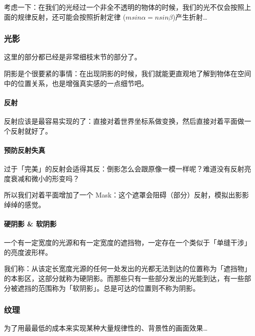 \documentclass[
]{article}
\begin{document}
考虑一下：在我们的光经过一个非全不透明的物体的时候，我们的光不仅会按照上面的规律反射，还可能会按照折射定律
(\(m sin\alpha = n sin\beta\))产生折射\ldots{}

\hypertarget{header-n30}{%
\subsubsection{光影}\label{header-n30}}

这里的部分都已经是非常细枝末节的部分了。

阴影是个很要紧的事情：在出现阴影的时候，我们就能更直观地了解到物体在空间中的位置关系，也是增强真实感的一点细节吧。

\hypertarget{header-n33}{%
\paragraph{反射}\label{header-n33}}

反射应该是最容易实现的了：直接对着世界坐标系做变换，然后直接对着平面做一个反射就好了。

\hypertarget{header-n35}{%
\paragraph{预防反射失真}\label{header-n35}}

过于「完美」的反射会适得其反：倒影怎么会跟原像一模一样呢？难道没有反射亮度衰减和微小的形变吗？

所以我们对着平面增加了一个
Mask：这个遮罩会阻碍（部分）反射，模拟出影影绰绰的感觉。

\hypertarget{header-n38}{%
\paragraph{硬阴影 \& 软阴影}\label{header-n38}}

一个有一定宽度的光源和有一定宽度的遮挡物，一定存在一个类似于「单缝干涉」的亮度波形样。

我们称：从该定长宽度光源的任何一处发出的光都无法到达的位置称为「遮挡物」的本影区，这部分就称为硬阴影。而那些只有一些部分发出的光能到达，有一些部分被遮挡的范围称为「软阴影」。总是可达的位置则不称为阴影。

\hypertarget{header-n41}{%
\subsubsection{纹理}\label{header-n41}}

为了用最最低的成本来实现某种大量规律性的、背景性的画面效果\ldots{}
\end{document}
